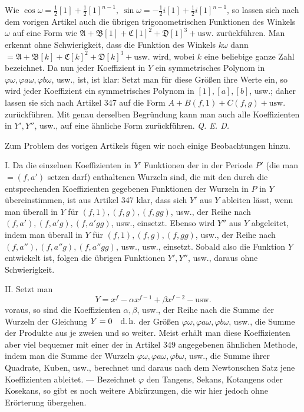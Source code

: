 Wie \(\cos\omega=\tfrac12[1]+\tfrac12[1]^{n-1},\allowbreak \ \sin\omega=-\tfrac12i[1]+\tfrac12i[1]^{n-1}\), so lassen sich nach dem vorigen Artikel auch die übrigen trigonometrischen Funktionen des Winkels \(\omega\) auf eine Form wie \(\mathfrak A+\mathfrak B[1]+\mathfrak C[1]^2+\mathfrak D[1]^3+\text{usw.}\) zurückführen. Man erkennt ohne Schwierigkeit, dass die Funktion des Winkels \(k\omega\) dann \(=\mathfrak A+\mathfrak B[k]+\mathfrak C[k]^2+\mathfrak D[k]^3+\text{usw.}\) wird, wobei \(k\) eine beliebige ganze Zahl bezeichnet. Da nun jeder Koeffizient in \(Y\) ein symmetrisches Polynom in \(\varphi\omega,\allowbreak \varphi a\omega,\allowbreak \varphi b\omega\), usw., ist, ist klar: Setzt man für diese Größen ihre Werte ein, so wird jeder Koeffizient ein symmetrisches Polynom in \([1],\allowbreak [a],\allowbreak [b]\), usw.; daher lassen sie sich nach Artikel 347 auf die Form \(A+B(f,1)+C(f,g)+\text{usw.}\) zurückführen. Mit genau derselben Begründung kann man auch alle Koeffizienten in \(Y',\allowbreak Y''\), usw., auf eine ähnliche Form zurückführen. \textit{Q. E. D.}

Zum Problem des vorigen Artikels fügen wir noch einige Beobachtungen hinzu.

I. Da die einzelnen Koeffizienten in \(Y'\) Funktionen der in der Periode \(P'\) (die man \(=(f,a')\) setzen darf) enthaltenen Wurzeln sind, die mit den durch die entsprechenden Koeffizienten gegebenen Funktionen der Wurzeln in \(P\) in \(Y\) übereinstimmen, ist aus Artikel 347 klar, dass sich \(Y'\) aus \(Y\) ableiten lässt, wenn man überall in \(Y\) für \((f,1),\allowbreak (f,g),\allowbreak (f,gg)\), usw., der Reihe nach \((f,a'),\allowbreak (f,a'g),\allowbreak (f,a'gg)\), usw., einsetzt. Ebenso wird \(Y''\) aus \(Y\) abgeleitet, indem man überall in \(Y\) für \((f,1),\allowbreak (f,g),\allowbreak (f,gg)\), usw., der Reihe nach \((f,a''),\allowbreak (f,a''g),\allowbreak (f,a''gg)\), usw., usw., einsetzt. Sobald also die Funktion \(Y\) entwickelt ist, folgen die übrigen Funktionen \(Y',\allowbreak Y''\), usw., daraus ohne Schwierigkeit.

II. Setzt man \[Y=x^f-\alpha x^{f-1}+\beta x^{f-2}-\text{usw.}\] voraus, so sind die Koeffizienten \(\alpha,\allowbreak \beta\), usw., der Reihe nach die Summe der Wurzeln der Gleichung \(Y=0\quad \text{d.\,h.}\) der Größen \(\varphi\omega,\allowbreak \varphi a\omega,\allowbreak \varphi b\omega\), usw., die Summe der Produkte aus je zweien und so weiter. Meist erhält man diese Koeffizienten aber viel bequemer mit einer der in Artikel 349 angegebenen ähnlichen Methode, indem man die Summe der Wurzeln \(\varphi\omega,\allowbreak \varphi a\omega,\allowbreak \varphi b\omega\), usw., die Summe ihrer Quadrate,
Kuben, usw., berechnet und daraus nach dem Newtonschen Satz jene Koeffizienten ableitet. — Bezeichnet \(\varphi\) den Tangens, Sekans, Kotangens oder Kosekans, so gibt es noch weitere Abkürzungen, die wir hier jedoch ohne Erörterung übergehen.


